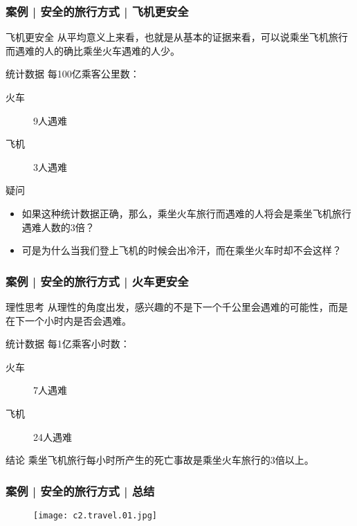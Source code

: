 \begin{frame}
  \frametitle{案例 | 安全的旅行方式 | 飞机更安全}
  \begin{block}{飞机更安全}
    从平均意义上来看，也就是从基本的证据来看，可以说乘坐飞机旅行而遇难的人的确比乘坐火车遇难的人少。
  \end{block}
  \pause
  \begin{block}{统计数据}
    每100亿乘客公里数：
    \begin{description}
      \item[火车] 9人遇难
      \item[飞机] 3人遇难
    \end{description}
  \end{block}
  \pause
  \begin{block}{疑问}
    \begin{itemize}
      \item 如果这种统计数据正确，那么，乘坐火车旅行而遇难的人将会是乘坐飞机旅行遇难人数的3倍？
      \item 可是为什么当我们登上飞机的时候会出冷汗，而在乘坐火车时却不会这样？
    \end{itemize}
  \end{block}
\end{frame}

\begin{frame}
  \frametitle{案例 | 安全的旅行方式 | 火车更安全}
  \begin{block}{理性思考}
    从理性的角度出发，感兴趣的不是下一个千公里会遇难的可能性，而是在下一个小时内是否会遇难。
  \end{block}
  \pause
  \begin{block}{统计数据}
    每1亿乘客小时数：
    \begin{description}
      \item[火车] 7人遇难
      \item[飞机] 24人遇难
    \end{description}
  \end{block}
  \pause
  \begin{block}{结论}
    乘坐飞机旅行每小时所产生的死亡事故是乘坐火车旅行的3倍以上。
  \end{block}
\end{frame}

\begin{frame}
  \frametitle{案例 | 安全的旅行方式 | 总结}
  \begin{figure}
    \centering
    \texttt{[image: c2.travel.01.jpg]}
  \end{figure}
\end{frame}


